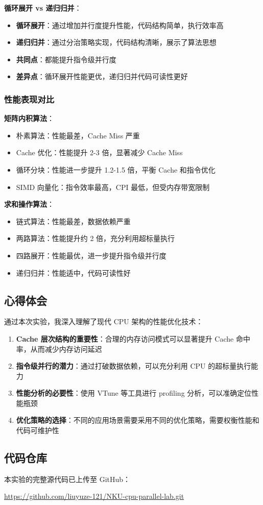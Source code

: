 ﻿\documentclass[9pt,a4paper]{article}
\begin{document}
\textbf{循环展开 vs 递归归并}：
\begin{itemize}
    \item \textbf{循环展开}：通过增加并行度提升性能，代码结构简单，执行效率高
    \item \textbf{递归归并}：通过分治策略实现，代码结构清晰，展示了算法思想
    \item \textbf{共同点}：都能提升指令级并行度
    \item \textbf{差异点}：循环展开性能更优，递归归并代码可读性更好
\end{itemize}

\subsubsection{性能表现对比}
\textbf{矩阵内积算法}：
\begin{itemize}
    \item 朴素算法：性能最差，Cache Miss 严重
    \item Cache 优化：性能提升 2-3 倍，显著减少 Cache Miss
    \item 循环分块：性能进一步提升 1.2-1.5 倍，平衡 Cache 和指令优化
    \item SIMD 向量化：指令效率最高，CPI 最低，但受内存带宽限制
\end{itemize}

\textbf{求和操作算法}：
\begin{itemize}
    \item 链式算法：性能最差，数据依赖严重
    \item 两路算法：性能提升约 2 倍，充分利用超标量执行
    \item 四路展开：性能最优，进一步提升指令级并行度
    \item 递归归并：性能适中，代码可读性好
\end{itemize}

\subsection{心得体会}
通过本次实验，我深入理解了现代 CPU 架构的性能优化技术：
\begin{enumerate}
    \item \textbf{Cache 层次结构的重要性}：合理的内存访问模式可以显著提升 Cache 命中率，从而减少内存访问延迟
    \item \textbf{指令级并行的潜力}：通过打破数据依赖，可以充分利用 CPU 的超标量执行能力
    \item \textbf{性能分析的必要性}：使用 VTune 等工具进行 profiling 分析，可以准确定位性能瓶颈
    \item \textbf{优化策略的选择}：不同的应用场景需要采用不同的优化策略，需要权衡性能和代码可维护性
\end{enumerate}

\subsection{代码仓库}
本实验的完整源代码已上传至 GitHub：
\begin{center}
\url{https://github.com/liuyuze-121/NKU-cpu-parallel-lab.git}
\end{center}
\end{document}
